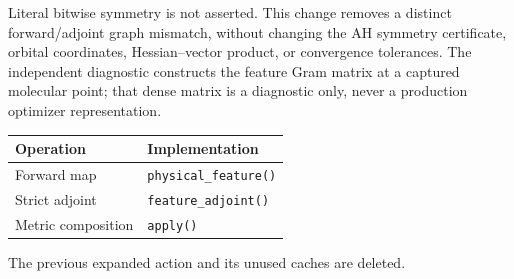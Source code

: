 \documentclass[11pt,a4paper]{article}
\begin{document}
Literal bitwise symmetry is not asserted. This change removes a distinct
forward/adjoint graph mismatch, without changing the AH symmetry certificate,
orbital coordinates, Hessian--vector product, or convergence tolerances.
The independent diagnostic constructs the feature Gram matrix at a captured
molecular point; that dense matrix is a diagnostic only, never a production
optimizer representation.

\begin{center}
\begin{tabular}{ll}
\toprule
Operation & Implementation \\
\midrule
Forward map & \texttt{physical\_feature()} \\
Strict adjoint & \texttt{feature\_adjoint()} \\
Metric composition & \texttt{apply()} \\
\bottomrule
\end{tabular}
\end{center}
The previous expanded action and its unused caches are deleted.
\end{document}

